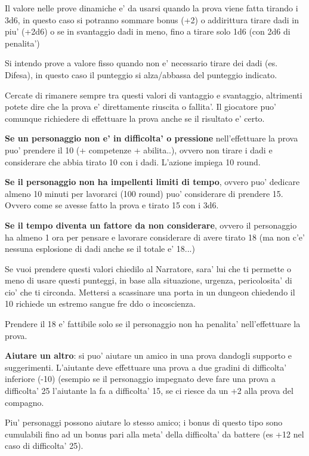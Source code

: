 \documentclass[a4paper,11pt,twoside,openany]{book}
\begin{document}
	\bigskip
	
	Il valore nelle prove dinamiche e' da usarsi quando la prova viene fatta tirando i 3d6, in questo caso si potranno sommare bonus (+2) o addirittura tirare dadi in piu' (+2d6) o se in svantaggio dadi in meno, fino a tirare solo 1d6 (con 2d6 di penalita')
	
	Si intendo prove a valore fisso quando non e' necessario tirare dei dadi (es. Difesa), in questo caso il punteggio si alza/abbassa del punteggio indicato.
	
	Cercate di rimanere sempre tra questi valori di vantaggio e svantaggio, altrimenti potete dire che la prova e' direttamente riuscita o fallita'.
	Il giocatore puo' comunque richiedere di effettuare la prova anche se il risultato e' certo.
	
	\textbf{Se un personaggio non e' in difficolta' o pressione} nell'effettuare la prova puo' prendere il 10 (+ competenze + abilita..), ovvero non tirare i dadi e considerare che abbia tirato 10 con i dadi. L'azione impiega 10 round.
	
	\textbf{Se il personaggio non ha impellenti limiti di tempo}, ovvero puo' dedicare almeno 10 minuti per lavorarci (100 round) puo' considerare di prendere 15. Ovvero come se avesse fatto la prova e tirato 15 con i 3d6.
	
	\textbf{Se il tempo diventa un fattore da non considerare}, ovvero il personaggio ha almeno 1 ora per pensare e lavorare considerare di avere tirato 18 (ma non c'e' nessuna esplosione di dadi anche se il totale e' 18...)
	
	Se vuoi prendere questi valori chiedilo al Narratore, sara' lui che ti permette o meno di usare questi punteggi, in base alla situazione, urgenza, pericolosita' di cio' che ti circonda. Mettersi a scassinare una porta in un dungeon chiedendo il 10 richiede un estremo sangue fre
	ddo o incoscienza.
	
	
	Prendere il 18 e' fattibile solo se il personaggio non ha penalita' nell'effettuare la prova.
	
	\textbf{Aiutare un altro}: si puo' aiutare un amico in una prova dandogli supporto e suggerimenti. L'aiutante deve effettuare una prova a due gradini di difficolta' inferiore (-10) (esempio se il personaggio impegnato deve fare una prova a difficolta' 25 l'aiutante la fa a difficolta' 15, se ci riesce da un +2 alla prova del compagno.
	
	
	Piu' personaggi possono aiutare lo stesso amico; i bonus di questo tipo sono cumulabili fino ad un bonus pari alla meta' della difficolta' da battere (es +12 nel caso di difficolta' 25).
	
\end{document}
